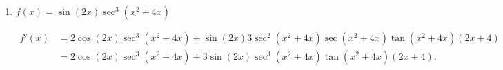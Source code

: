 \documentclass{ximera}
\begin{document}
\begin{problem}
\begin{enumerate}
\begin{explanation}
\begin{align*}
			&= \frac{7x^6 + \cot(x) - (x+5)(42x^5 - \csc^2(x))}{(7x^6 + \cot(x))^2}.
			\end{align*}
			\end{explanation}	
\item  $f(x) = \sin{\left(2x\right)}\sec^{3}{\left(x^2+4x\right)}$
			\begin{explanation}
			\begin{align*}
			f'(x) &=2\cos{\left(2x\right)}\sec^{3}{\left(x^2+4x\right)}+\sin{\left(2x\right)}3\sec^{2}{\left(x^2+4x\right)} \sec{\left(x^2+4x\right)}\tan{\left(x^2+4x\right)}\left(2x+4\right)  \\
			&=2\cos{\left(2x\right)}\sec^{3}{\left(x^2+4x\right)}+3\sin{\left(2x\right)}\sec^{3}{\left(x^2+4x\right)} \tan{\left(x^2+4x\right)}\left(2x+4\right)  .
			\end{align*}
			\end{explanation}
\end{enumerate}
		
\end{problem}
\end{document}
